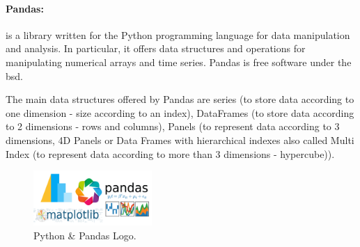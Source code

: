 \paragraph*{Pandas:} 

is a library\cite{PandasPythonData} written for the Python programming language for data manipulation and analysis. In particular, it offers data structures and operations for manipulating numerical arrays and time series. Pandas is free software under the \gls{bsd}.


The main data structures offered by Pandas are series (to store data according to one dimension - size according to an index), DataFrames (to store data according to 2 dimensions - rows and columns), Panels (to represent data according to 3 dimensions, 4D Panels or Data Frames with hierarchical indexes also called Multi Index (to represent data according to more than 3 dimensions - hypercube))\cite{Pandas2020}.
\begin{figure}[h!]
  \center
  \includegraphics[width=0.40\textwidth]{images/chapter4/python_pandas.png}
  \caption{Python \& Pandas Logo.}
  \label{fig:python}
\end{figure}

\newpage

